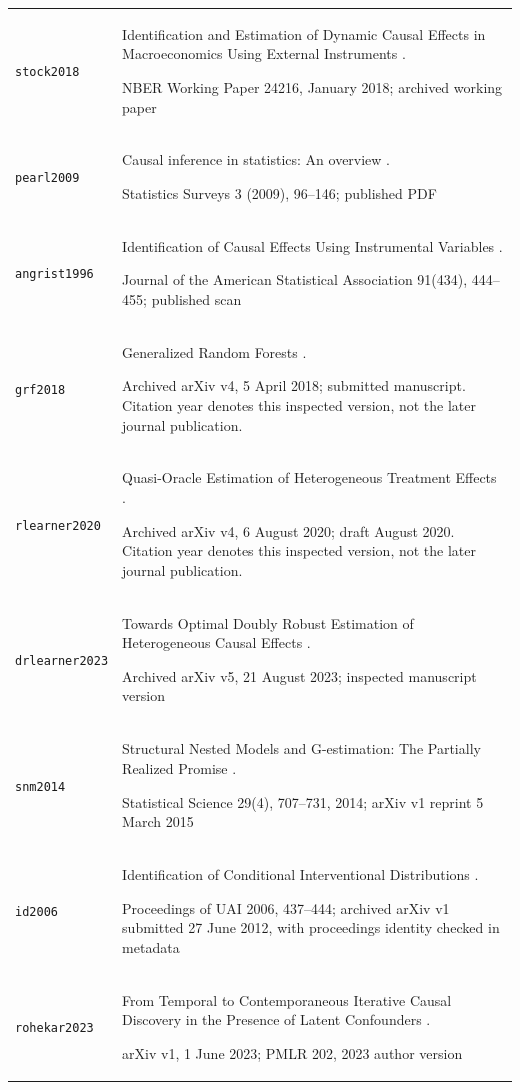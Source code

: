\begin{longtable}{P{32mm}P{112mm}}
{\scriptsize\texttt{stock2018}} & Identification and Estimation of Dynamic Causal Effects in Macroeconomics Using External Instruments \citep{stock2018}.\par NBER Working Paper 24216, January 2018; archived working paper\\
{\scriptsize\texttt{pearl2009}} & Causal inference in statistics: An overview \citep{pearl2009}.\par Statistics Surveys 3 (2009), 96--146; published PDF\\
{\scriptsize\texttt{angrist1996}} & Identification of Causal Effects Using Instrumental Variables \citep{angrist1996}.\par Journal of the American Statistical Association 91(434), 444--455; published scan\\
{\scriptsize\texttt{grf2018}} & Generalized Random Forests \citep{grf2018}.\par Archived arXiv v4, 5 April 2018; submitted manuscript. Citation year denotes this inspected version, not the later journal publication.\\
{\scriptsize\texttt{rlearner2020}} & Quasi-Oracle Estimation of Heterogeneous Treatment Effects \citep{rlearner2020}.\par Archived arXiv v4, 6 August 2020; draft August 2020. Citation year denotes this inspected version, not the later journal publication.\\
{\scriptsize\texttt{drlearner2023}} & Towards Optimal Doubly Robust Estimation of Heterogeneous Causal Effects \citep{drlearner2023}.\par Archived arXiv v5, 21 August 2023; inspected manuscript version\\
{\scriptsize\texttt{snm2014}} & Structural Nested Models and G-estimation: The Partially Realized Promise \citep{snm2014}.\par Statistical Science 29(4), 707--731, 2014; arXiv v1 reprint 5 March 2015\\
{\scriptsize\texttt{id2006}} & Identification of Conditional Interventional Distributions \citep{id2006}.\par Proceedings of UAI 2006, 437--444; archived arXiv v1 submitted 27 June 2012, with proceedings identity checked in metadata\\
{\scriptsize\texttt{rohekar2023}} & From Temporal to Contemporaneous Iterative Causal Discovery in the Presence of Latent Confounders \citep{rohekar2023}.\par arXiv v1, 1 June 2023; PMLR 202, 2023 author version\\

\end{longtable}

